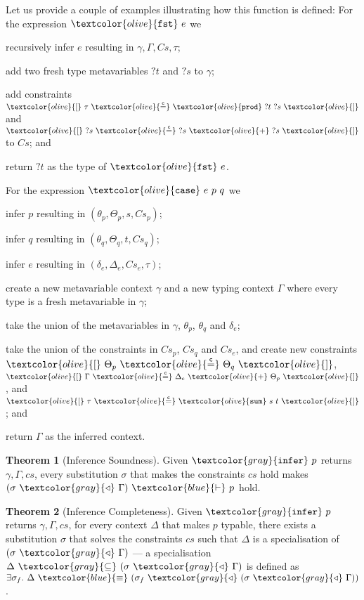 \documentclass[sigplan,screen,review]{acmart}
\theoremstyle{definition}\newtheorem{mytheorem}{Theorem}[section]
\newcommand{\constr}[1]{\textcolor{olive}{\mathtt{#1}}}
\newcommand{\func}[1]{\textcolor{gray}{\mathtt{#1}}}
\newcommand{\type}[1]{\textcolor{blue}{\mathtt{#1}}}
\newcommand{\tEq}[2]{#1~\type{\equiv}~#2}
\newcommand{\tProc}[2]{#1 ~ \type{\vdash} ~ #2}
\newcommand{\sfst}{\constr{fst}}
\newcommand{\scase}{\constr{case}}
\newcommand{\tsum}{\constr{sum}}
\newcommand{\tprod}{\constr{prod}}
\newcommand{\subst}[2]{#1 ~ \func{\triangleleft} ~ #2}
\newcommand{\eqconstr}[2]{\constr{[} ~ #1 ~ \constr{\stackrel{c}{=}} ~ #2 ~ \constr{]}}
\newcommand{\sumconstr}[3]{\constr{[} ~ #1 ~ \constr{\stackrel{c}{=}} ~ #2 ~ \constr{+} ~ #3 ~ \constr{]}}
\begin{document}
Let us provide a couple of examples illustrating how this function is defined:
For the expression $\sfst~e$ we
\begin{enumerate*}[label=\textcolor{gray}{\arabic*)}]
  \item recursively infer $e$ resulting in $\gamma,\Gamma,Cs,\tau$;
  \item add two fresh type metavariables $?t$ and $?s$ to $\gamma$;
  \item add constraints $\eqconstr{\tau}{\tprod~?t~?s}$ and $\sumconstr{?s}{?s}{?s}$ to $Cs$; and
  \item return $?t$ as the type of $\sfst~e$.
\end{enumerate*}

For the expression $\scase~e~p~q$ we
  \begin{enumerate*}[label=\textcolor{gray}{\arabic*)}]
  \item infer $p$ resulting in $(\theta_p, \Theta_p, s , Cs_p)$;
  \item infer $q$ resulting in $(\theta_q, \Theta_q, t , Cs_q)$;
  \item infer $e$ resulting in $(\delta_e, \Delta_e, Cs_e, \tau)$;
  \item create a new metavariable context $\gamma$ and a new typing context $\Gamma$ where every type is a fresh metavariable in $\gamma$;
  \item take the union of the metavariables in $\gamma$, $\theta_p$, $\theta_q$ and $\delta_e$;
  \item take the union of the constraints in $Cs_p$, $Cs_q$ and $Cs_e$, and create new constraints $\eqconstr{\Theta_p}{\Theta_q}$, $\sumconstr{\Gamma}{\Delta_e}{\Theta_p}$, and $\eqconstr{\tau}{\tsum~s~t}$; and
  \item return $\Gamma$ as the inferred context.
\end{enumerate*}

\begin{mytheorem}[Inference Soundness]\label{inference-soundness}
Given $\func{infer}~p$ returns $\gamma , \Gamma , cs$, every substitution \(\sigma\) that makes the constraints $cs$ hold makes $\tProc{(\subst{\sigma}{\Gamma})}{p}$ hold.
\end{mytheorem}

\begin{mytheorem}[Inference Completeness]\label{inference-completeness}
Given $\func{infer}~p$ returns $\gamma , \Gamma , cs$, for every context \(\Delta\) that makes $p$ typable, there exists a substitution \(\sigma\) that solves the constraints $cs$ such that $\Delta$ is a specialisation of $(\subst{\sigma}{\Gamma})$ --- a specialisation $\Delta ~ \func{\subseteq} ~ (\subst{\sigma}{\Gamma})$ is defined as $\exists \sigma_f . ~ \tEq{\Delta}{(\subst{\sigma_f}{(\subst{\sigma}{\Gamma})})}$.
\end{mytheorem}
\end{document}
